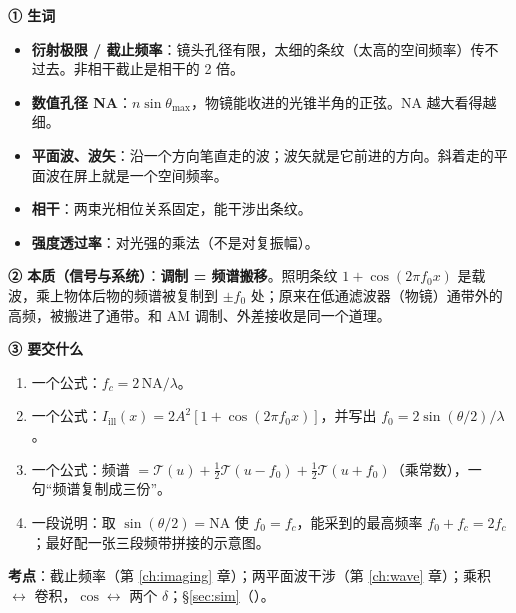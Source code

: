\label{rd:v-sim}
\begin{idea}[读题：概念与要交什么]
\textbf{① 生词}
\begin{itemize}
\item \textbf{衍射极限 / 截止频率}：镜头孔径有限，太细的条纹（太高的空间频率）传不过去。非相干截止是相干的 2 倍。
\item \textbf{数值孔径 NA}：$n\sin\theta_{\max}$，物镜能收进的光锥半角的正弦。NA 越大看得越细。
\item \textbf{平面波、波矢}：沿一个方向笔直走的波；波矢就是它前进的方向。斜着走的平面波在屏上就是一个空间频率。
\item \textbf{相干}：两束光相位关系固定，能干涉出条纹。
\item \textbf{强度透过率}：对光强的乘法（不是对复振幅）。
\end{itemize}
\textbf{② 本质（信号与系统）}：\textbf{调制 = 频谱搬移}。照明条纹 $1+\cos(2\pi f_0x)$ 是载波，乘上物体后物的频谱被复制到 $\pm f_0$ 处；原来在低通滤波器（物镜）通带外的高频，被搬进了通带。和 AM 调制、外差接收是同一个道理。

\textbf{③ 要交什么}
\begin{enumerate}[label=\roman*.]
\item 一个公式：$f_c=2\,\mathrm{NA}/\lambda$。
\item 一个公式：$I_{\text{ill}}(x)=2A^2[1+\cos(2\pi f_0x)]$，并写出 $f_0=2\sin(\theta/2)/\lambda$。
\item 一个公式：频谱 $=\mathcal T(u)+\frac12\mathcal T(u-f_0)+\frac12\mathcal T(u+f_0)$（乘常数），一句“频谱复制成三份”。
\item 一段说明：取 $\sin(\theta/2)=\mathrm{NA}$ 使 $f_0=f_c$，能采到的最高频率 $f_0+f_c=2f_c$；最好配一张三段频带拼接的示意图。
\end{enumerate}
\end{idea}


\textbf{考点}：截止频率（第 \ref{ch:imaging} 章）；两平面波干涉（第 \ref{ch:wave} 章）；乘积 $\leftrightarrow$ 卷积，$\cos\leftrightarrow$ 两个 $\delta$；§\ref{sec:sim}（\pageref{sec:sim}）。


